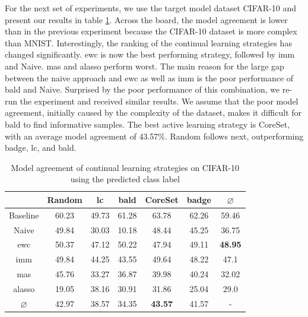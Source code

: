 For the next set of experiments, we use the target model dataset CIFAR-10 and present our results in table \ref{fig:ModelStealingCIFAR10Label}. 
Across the board, the model agreement is lower than in the previous experiment because the CIFAR-10 dataset is more complex than MNIST. Interestingly, the ranking of
the continual learning strategies has changed significantly. \gls{ewc} is now the best performing strategy, followed by \gls{imm} and Naive. \gls{mas} and \gls{alasso}
perform worst. The main reason for the large gap between the naive approach and \gls{ewc} as well as \gls{imm} is the poor performance of \gls{bald} and Naive.
Surprised by the poor performance of this combination, we re-run the experiment and received similar results. We assume that the poor model agreement, initially
caused by the complexity of the dataset, makes it difficult for \gls{bald} to find informative samples. The best active learning strategy is CoreSet, with an average
model agreement of 43.57\%. Random follows next, outperforming \gls{badge}, \gls{lc}, and \gls{bald}. \par

\begin{table}[h]
    \centering
    \begin{tabular}{ c | c c c c c | c } 
         & Random & \gls{lc} & \gls{bald} & CoreSet & \gls{badge} & $\varnothing$\\ 
        \hline
        Baseline & 60.23 & 49.73 & 61.28 & 63.78 & 62.26 & 59.46\\
        \hline
        Naive & 49.84 & 30.03 & 10.18 & 48.44 & 45.25 & 36.75\\
        \gls{ewc} & 50.37 & 47.12 & 50.22 & 47.94 & 49.11 & \textbf{48.95} \\
        \gls{imm} & 49.84 & 44.25 & 43.55 & 49.64 & 48.22 & 47.1\\
        \gls{mas} & 45.76 & 33.27 & 36.87 & 39.98 & 40.24 & 32.02\\
        \gls{alasso} & 19.05 & 38.16 & 30.91 & 31.86 & 25.04 & 29.0\\
        \hline
        $\varnothing$ & 42.97 & 38.57 & 34.35 & \textbf{43.57} & 41.57 & -\\
    \end{tabular}
    \caption{Model agreement of continual learning strategies on CIFAR-10 using the predicted class label}
    \label{fig:ModelStealingCIFAR10Label}
\end{table}


